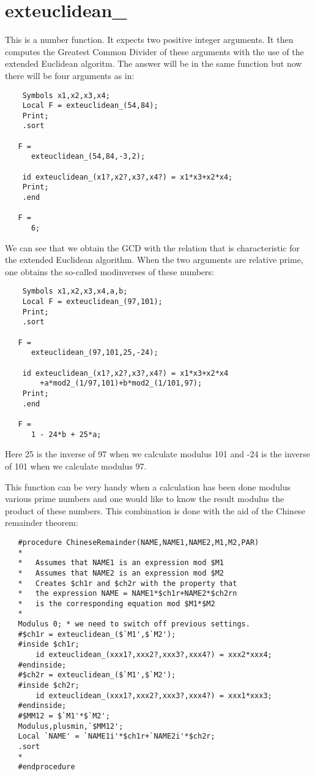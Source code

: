 
\section{exteuclidean\_}
\label{funexteuclidean}

\noindent This is a number function. It expects two positive integer 
arguments. It then computes the Greatest Common Divider of these arguments 
with the use of the extended Euclidean algoritm. The answer will be in the 
same function but now there will be four arguments as in:
\begin{verbatim}
    Symbols x1,x2,x3,x4;
    Local F = exteuclidean_(54,84);
    Print;
    .sort

   F =
      exteuclidean_(54,84,-3,2);

    id exteuclidean_(x1?,x2?,x3?,x4?) = x1*x3+x2*x4;
    Print;
    .end

   F =
      6;
\end{verbatim}
\noindent We can see that we obtain the GCD with the relation that is 
characteristic for the extended Euclidean algorithm. When the two arguments 
are relative prime, one obtains the so-called modinverses of these numbers:
\begin{verbatim}
    Symbols x1,x2,x3,x4,a,b;
    Local F = exteuclidean_(97,101);
    Print;
    .sort

   F =
      exteuclidean_(97,101,25,-24);

    id exteuclidean_(x1?,x2?,x3?,x4?) = x1*x3+x2*x4
        +a*mod2_(1/97,101)+b*mod2_(1/101,97);
    Print;
    .end

   F =
      1 - 24*b + 25*a;
\end{verbatim}
\noindent Here 25 is the inverse of 97 when we calculate modulus 101 and 
-24 is the inverse of 101 when we calculate modulus 97.

\noindent This function can be very handy when a calculation has been done 
modulus various prime numbers and one would like to know the result modulus 
the product of these numbers. This combination is done with the aid of the 
Chinese remainder theorem:
\begin{verbatim}
   #procedure ChineseRemainder(NAME,NAME1,NAME2,M1,M2,PAR)
   *
   *   Assumes that NAME1 is an expression mod $M1
   *   Assumes that NAME2 is an expression mod $M2
   *   Creates $ch1r and $ch2r with the property that
   *   the expression NAME = NAME1*$ch1r+NAME2*$ch2rn
   *   is the corresponding equation mod $M1*$M2
   *
   Modulus 0; * we need to switch off previous settings.
   #$ch1r = exteuclidean_($`M1',$`M2');
   #inside $ch1r;
       id exteuclidean_(xxx1?,xxx2?,xxx3?,xxx4?) = xxx2*xxx4;
   #endinside;
   #$ch2r = exteuclidean_($`M1',$`M2');
   #inside $ch2r;
       id exteuclidean_(xxx1?,xxx2?,xxx3?,xxx4?) = xxx1*xxx3;
   #endinside;
   #$MM12 = $`M1'*$`M2';
   Modulus,plusmin,`$MM12';
   Local `NAME' = `NAME1i'*$ch1r+`NAME2i'*$ch2r;
   .sort
   *
   #endprocedure
\end{verbatim}


